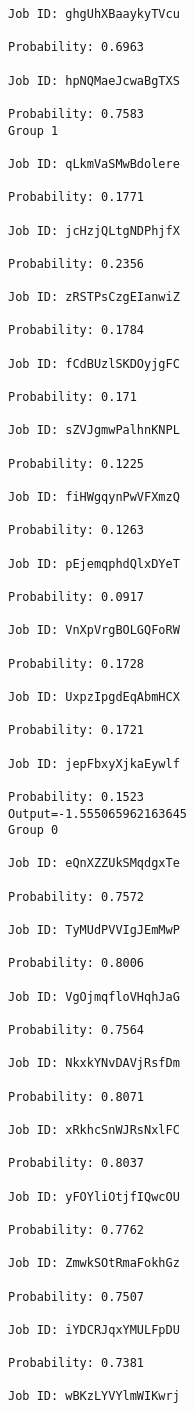 \documentclass[11pt]{article}
\begin{document}
\begin{Verbatim}[commandchars=\\\{\}]
Job ID: ghgUhXBaaykyTVcu

Probability: 0.6963

Job ID: hpNQMaeJcwaBgTXS

Probability: 0.7583
Group 1

Job ID: qLkmVaSMwBdolere

Probability: 0.1771

Job ID: jcHzjQLtgNDPhjfX

Probability: 0.2356

Job ID: zRSTPsCzgEIanwiZ

Probability: 0.1784

Job ID: fCdBUzlSKDOyjgFC

Probability: 0.171

Job ID: sZVJgmwPalhnKNPL

Probability: 0.1225

Job ID: fiHWgqynPwVFXmzQ

Probability: 0.1263

Job ID: pEjemqphdQlxDYeT

Probability: 0.0917

Job ID: VnXpVrgBOLGQFoRW

Probability: 0.1728

Job ID: UxpzIpgdEqAbmHCX

Probability: 0.1721

Job ID: jepFbxyXjkaEywlf

Probability: 0.1523
Output=-1.555065962163645
Group 0

Job ID: eQnXZZUkSMqdgxTe

Probability: 0.7572

Job ID: TyMUdPVVIgJEmMwP

Probability: 0.8006

Job ID: VgOjmqfloVHqhJaG

Probability: 0.7564

Job ID: NkxkYNvDAVjRsfDm

Probability: 0.8071

Job ID: xRkhcSnWJRsNxlFC

Probability: 0.8037

Job ID: yFOYliOtjfIQwcOU

Probability: 0.7762

Job ID: ZmwkSOtRmaFokhGz

Probability: 0.7507

Job ID: iYDCRJqxYMULFpDU

Probability: 0.7381

Job ID: wBKzLYVYlmWIKwrj


\end{Verbatim}
\end{document}
